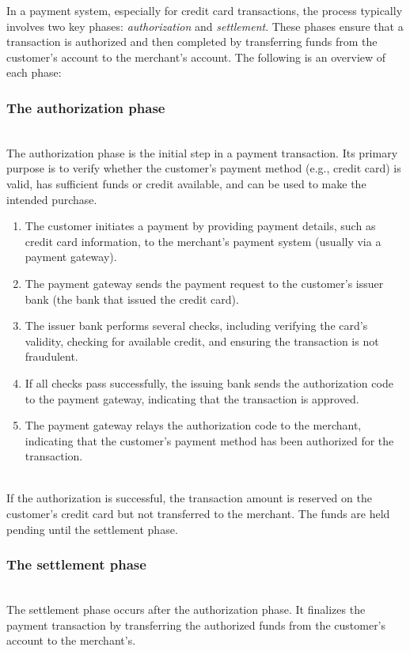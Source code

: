 In a payment system, especially for credit card transactions, the process typically involves two key phases: \emph{authorization} and \emph{settlement}. These phases ensure that a transaction is authorized and then completed by transferring funds from the customer's account to the merchant's account. The following is an overview of each phase:

\subsubsection{The authorization phase}\label{m_sVjP3-kC8zVKg6r8TKw}
\\
The authorization phase is the initial step in a payment transaction. Its primary purpose is to verify whether the customer's payment method (e.g., credit card) is valid, has sufficient funds or credit available, and can be used to make the intended purchase.

\begin{enumerate}
\item
\protect{}\label{aJNzabO1gkrC_2LDQ06Tw}
The customer initiates a payment by providing payment details, such as credit card information, to the merchant's payment system (usually via a payment gateway).
\item
\protect{}\label{QOJsZvKFiEoIRPRnGxDTj}
The payment gateway sends the payment request to the customer's issuer bank (the bank that issued the credit card).
\item
\protect{}\label{Q1U4m0ry0-wulniV2Ecft}
The issuer bank performs several checks, including verifying the card's validity, checking for available credit, and ensuring the transaction is not fraudulent.
\item
\protect{}\label{qQ8aBmO9FVfY5xnnrw9G4}
If all checks pass successfully, the issuing bank sends the authorization code to the payment gateway, indicating that the transaction is approved.
\item
\protect{}\label{BWDoaz1OBY07OhgNSFed1}
The payment gateway relays the authorization code to the merchant, indicating that the customer's payment method has been authorized for the transaction.
\end{enumerate}
\\
If the authorization is successful, the transaction amount is reserved on the customer's credit card but not transferred to the merchant. The funds are held pending until the settlement phase.

\subsubsection{The settlement phase}\label{k-bOJasmnmRB0SLbhKTmW}
\\
The settlement phase occurs after the authorization phase. It finalizes the payment transaction by transferring the authorized funds from the customer's account to the merchant's.

